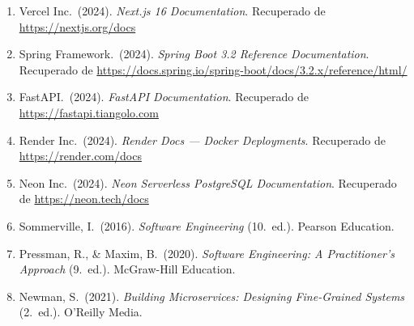 \documentclass[12pt,a4paper]{article}
\begin{document}
\begin{enumerate}[leftmargin=1.5cm]
  \item Vercel Inc.\ (2024). \textit{Next.js 16 Documentation}.
    Recuperado de \url{https://nextjs.org/docs}

  \item Spring Framework.\ (2024). \textit{Spring Boot 3.2 Reference Documentation}.
    Recuperado de \url{https://docs.spring.io/spring-boot/docs/3.2.x/reference/html/}

  \item FastAPI.\ (2024). \textit{FastAPI Documentation}.
    Recuperado de \url{https://fastapi.tiangolo.com}

  \item Render Inc.\ (2024). \textit{Render Docs --- Docker Deployments}.
    Recuperado de \url{https://render.com/docs}

  \item Neon Inc.\ (2024). \textit{Neon Serverless PostgreSQL Documentation}.
    Recuperado de \url{https://neon.tech/docs}

  \item Sommerville, I.\ (2016). \textit{Software Engineering} (10.\textordfeminine\ ed.).
    Pearson Education.

  \item Pressman, R., \& Maxim, B.\ (2020). \textit{Software Engineering:
    A Practitioner's Approach} (9.\textordfeminine\ ed.). McGraw-Hill Education.

  \item Newman, S.\ (2021). \textit{Building Microservices: Designing Fine-Grained
    Systems} (2.\textordfeminine\ ed.). O'Reilly Media.
\end{enumerate}
\end{document}
